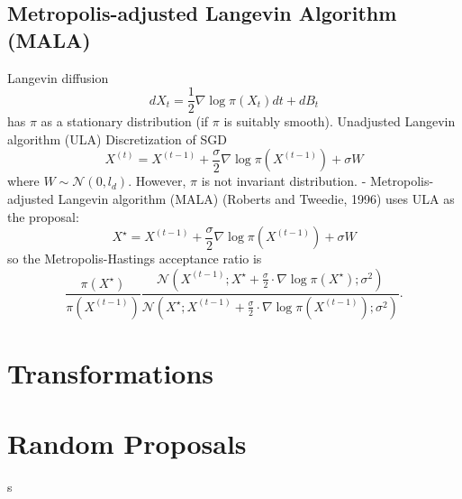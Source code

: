 \documentclass{article}
\begin{document}
\subsection{Metropolis-adjusted Langevin Algorithm (MALA)}
Langevin diffusion
$$
d X_t=\frac{1}{2} \nabla \log \pi\left(X_t\right) d t+d B_t
$$
has $\pi$ as a stationary distribution (if $\pi$ is suitably smooth).
Unadjusted Langevin algorithm (ULA)
Discretization of SGD
$$
X^{(t)}=X^{(t-1)}+\frac{\sigma}{2} \nabla \log \pi\left(X^{(t-1)}\right)+\sigma W
$$
where $W \sim \mathcal{N}\left(0, l_d\right)$. However, $\pi$ is not invariant distribution.
- Metropolis-adjusted Langevin algorithm (MALA) (Roberts and Tweedie, 1996) uses ULA as the proposal:
$$
X^{\star}=X^{(t-1)}+\frac{\sigma}{2} \nabla \log \pi\left(X^{(t-1)}\right)+\sigma W
$$
so the Metropolis-Hastings acceptance ratio is
$$
\frac{\pi\left(X^{\star}\right)}{\pi\left(X^{(t-1)}\right)} \frac{\mathcal{N}\left(X^{(t-1)} ; X^{\star}+\frac{\sigma}{2} \cdot \nabla \log \pi\left(X^{\star}\right) ; \sigma^2\right)}{\mathcal{N}\left(X^{\star} ; X^{(t-1)}+\frac{\sigma}{2} \cdot \nabla \log \pi\left(X^{(t-1)}\right) ; \sigma^2\right)} .
$$

\section{Transformations}
\section{Random Proposals}s
\end{document}
